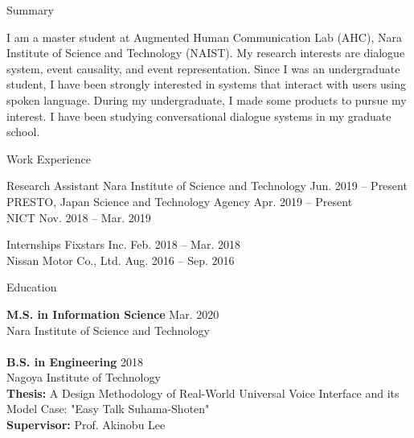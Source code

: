 \documentclass{resume} %
\begin{document}

\begin{rSection}{Summary}

I am a master student at Augmented Human Communication Lab (AHC), Nara Institute of Science and Technology (NAIST).
My research interests are dialogue system, event causality, and event representation.
Since I was an undergraduate student, I have been strongly interested in systems that interact with users using spoken language.
During my undergraduate, I made some products to pursue my interest.
I have been studying conversational dialogue systems in my graduate school.

\end{rSection}


\begin{rSection}{Work Experience}

\begin{rSubsection}{Research Assistant}{}{}{}
Nara Institute of Science and Technology \hfill Jun. 2019 -- Present
\\PRESTO, Japan Science and Technology Agency \hfill Apr. 2019 -- Present
\\NICT \hfill Nov. 2018 -- Mar. 2019
\end{rSubsection}

\begin{rSubsection}{Internships}{}{}{}
Fixstars Inc. \hfill Feb. 2018 -- Mar. 2018
\\Nissan Motor Co., Ltd. \hfill Aug. 2016 -- Sep. 2016
\end{rSubsection}

\end{rSection}


\begin{rSection}{Education}

{\bf M.S. in Information Science} \hfill Mar. 2020 
\\ Nara Institute of Science and Technology
\\
\\{\bf B.S. in Engineering} \hfill 2018 
\\ Nagoya Institute of Technology
\\ {\bf Thesis:} A Design Methodology of Real-World Universal Voice Interface and its Model Case: "Easy Talk Suhama-Shoten"
\\ {\bf Supervisor:} Prof. Akinobu Lee

\end{rSection}
\end{document}
